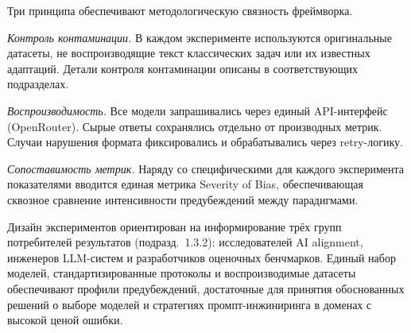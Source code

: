 Три принципа обеспечивают методологическую связность фреймворка.

\textit{Контроль контаминации.} В каждом эксперименте используются оригинальные датасеты, не воспроизводящие текст классических задач или их известных адаптаций. Детали контроля контаминации описаны в соответствующих подразделах.

\textit{Воспроизводимость.} Все модели запрашивались через единый API-интерфейс (OpenRouter). Сырые ответы сохранялись отдельно от производных метрик. Случаи нарушения формата фиксировались и обрабатывались через retry-логику.

\textit{Сопоставимость метрик.} Наряду со специфическими для каждого эксперимента показателями вводится единая метрика Severity of Bias, обеспечивающая сквозное сравнение интенсивности предубеждений между парадигмами.

Дизайн экспериментов ориентирован на информирование трёх групп потребителей результатов (подразд.~1.3.2): исследователей AI alignment, инженеров LLM-систем и разработчиков оценочных бенчмарков. Единый набор моделей, стандартизированные протоколы и воспроизводимые датасеты обеспечивают профили предубеждений, достаточные для принятия обоснованных решений о выборе моделей и стратегиях промпт-инжиниринга в доменах с высокой ценой ошибки.


